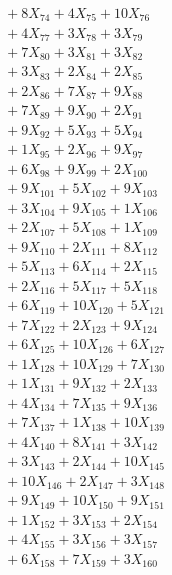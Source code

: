 \documentclass[a4paper,10pt]{article}
\begin{document}
{\begin{align}
&\;  + 8 X_{74} + 4 X_{75} + 10 X_{76} \\[0.3ex]
&\;  + 4 X_{77} + 3 X_{78} + 3 X_{79} \\[0.3ex]
&\;  + 7 X_{80} + 3 X_{81} + 3 X_{82} \\[0.3ex]
&\;  + 3 X_{83} + 2 X_{84} + 2 X_{85} \\[0.3ex]
&\;  + 2 X_{86} + 7 X_{87} + 9 X_{88} \\[0.3ex]
&\;  + 7 X_{89} + 9 X_{90} + 2 X_{91} \\[0.3ex]
&\;  + 9 X_{92} + 5 X_{93} + 5 X_{94} \\[0.3ex]
&\;  + 1 X_{95} + 2 X_{96} + 9 X_{97} \\[0.3ex]
&\;  + 6 X_{98} + 9 X_{99} + 2 X_{100} \\[0.3ex]
&\;  + 9 X_{101} + 5 X_{102} + 9 X_{103} \\[0.5ex]\allowbreak
&\;  + 3 X_{104} + 9 X_{105} + 1 X_{106} \\[0.3ex]
&\;  + 2 X_{107} + 5 X_{108} + 1 X_{109} \\[0.3ex]
&\;  + 9 X_{110} + 2 X_{111} + 8 X_{112} \\[0.3ex]
&\;  + 5 X_{113} + 6 X_{114} + 2 X_{115} \\[0.3ex]
&\;  + 2 X_{116} + 5 X_{117} + 5 X_{118} \\[0.3ex]
&\;  + 6 X_{119} + 10 X_{120} + 5 X_{121} \\[0.3ex]
&\;  + 7 X_{122} + 2 X_{123} + 9 X_{124} \\[0.3ex]
&\;  + 6 X_{125} + 10 X_{126} + 6 X_{127} \\[0.3ex]
&\;  + 1 X_{128} + 10 X_{129} + 7 X_{130} \\[0.3ex]
&\;  + 1 X_{131} + 9 X_{132} + 2 X_{133} \\[0.5ex]\allowbreak
&\;  + 4 X_{134} + 7 X_{135} + 9 X_{136} \\[0.3ex]
&\;  + 7 X_{137} + 1 X_{138} + 10 X_{139} \\[0.3ex]
&\;  + 4 X_{140} + 8 X_{141} + 3 X_{142} \\[0.3ex]
&\;  + 3 X_{143} + 2 X_{144} + 10 X_{145} \\[0.3ex]
&\;  + 10 X_{146} + 2 X_{147} + 3 X_{148} \\[0.3ex]
&\;  + 9 X_{149} + 10 X_{150} + 9 X_{151} \\[0.3ex]
&\;  + 1 X_{152} + 3 X_{153} + 2 X_{154} \\[0.3ex]
&\;  + 4 X_{155} + 3 X_{156} + 3 X_{157} \\[0.3ex]
&\;  + 6 X_{158} + 7 X_{159} + 3 X_{160} \\[0.3ex]

\end{align}}
\end{document}
